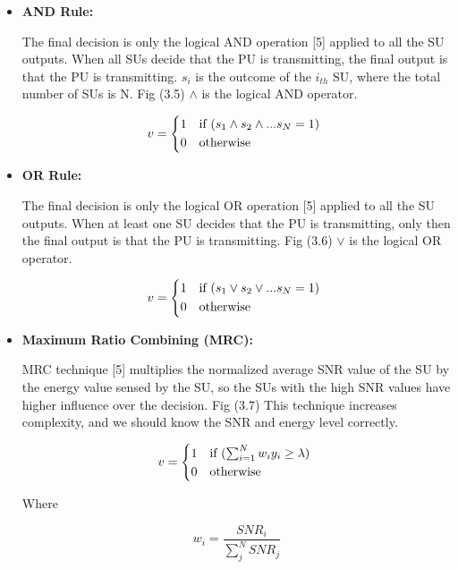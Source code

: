 \begin{itemize}	
\item \textbf{AND Rule:}

The final decision is only the logical AND operation [5] applied to all the SU outputs. When all SUs decide that the PU is transmitting, the final output is that the PU is transmitting. $s_{i}$ is the outcome of the $i_{th}$ SU, where the total number of SUs is N. Fig (3.5) $\wedge$ is the logical AND operator.

 \begin{equation}
    v =
    \begin{cases*}
      1  & if $(s_1 \wedge s_2 \wedge ... s_N = 1 )$ \\
      0        & otherwise
    \end{cases*}
  \end{equation}

\item \textbf{OR Rule:}

The final decision is only the logical OR operation [5] applied to all the SU outputs. When at least one SU decides that the PU is transmitting, only then the final output is that the PU is transmitting. Fig (3.6) $\vee$ is the logical OR operator.

 \begin{equation}
    v =
    \begin{cases*}
      1  & if $(s_1 \vee s_2 \vee ... s_N = 1 )$ \\
      0        & otherwise
    \end{cases*}
  \end{equation}

\item \textbf{Maximum Ratio Combining (MRC):}

MRC technique [5] multiplies the normalized average SNR value of the SU by the energy value sensed by the SU, so the SUs with the high SNR values have higher influence over the decision. Fig (3.7) This technique increases complexity, and we should know the SNR and energy level correctly.

 \begin{equation}
    v =
    \begin{cases*}
      1  & if $(\sum_{i=1}^{N} w_i y_i   \geq \lambda)$ \\
      0        & otherwise
    \end{cases*}
  \end{equation}

Where 

 \begin{equation}
    w_i= \frac  {SNR_i}   {\sum_{j}^{N} SNR_j}
  \end{equation}

\end{itemize}




